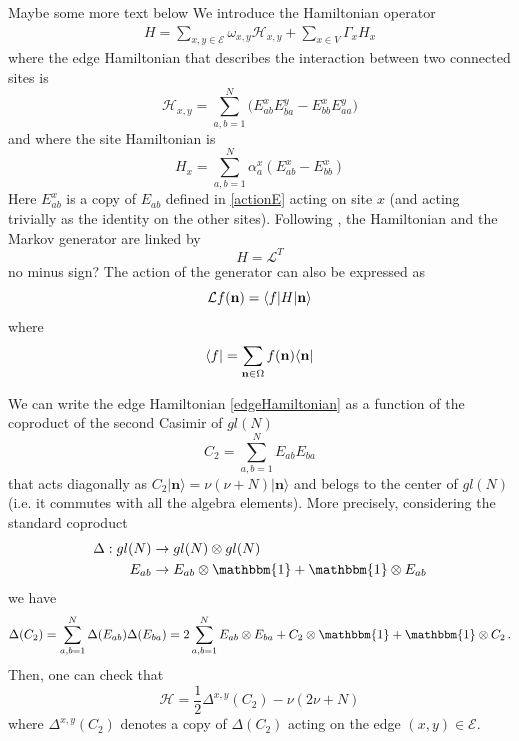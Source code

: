 \documentclass[11pt]{article}
\numberwithin{equation}{section}
\numberwithin{equation}{subsection}
\newcommand{\twoj}{\nu}
\begin{document}
{\color{red}Maybe some more text below}
We introduce the Hamiltonian operator
\begin{equation}\label{OriginalHamiltonian}
	\begin{split}
		H=\sum_{x,y\in \mathcal{E}}\omega_{x,y}\mathcal{H}_{x,y}+\sum_{x\in V}\Gamma_{x}H_{x}
	\end{split}
\end{equation}
where the edge Hamiltonian that describes the interaction between two connected sites is
\begin{equation}\label{edgeHamiltonian}
\mathcal{H}_{x,y}=\sum_{a,b=1}^{N}\Big(E_{ab}^{x} E_{b a}^{y}-E_{bb}^{x} E_{aa}^{y}\Big)
 \end{equation}
  and where the site Hamiltonian is
 \begin{equation}\label{siteHamiltonian}
H_{x}=\sum_{a,b=1}^{N}\alpha_{a}^{x}\left(E_{ab}^{x}-E_{bb}^{x}\right)
\end{equation}
Here $E_{ab}^{x}$ is a copy of $E_{ab}$ defined in \eqref{actionE} acting on site $x$ (and
acting trivially as the identity on the other sites). 
Following  \cite{belitsky2015self}, the Hamiltonian and the Markov generator are linked by
\begin{equation}\label{Hamiltonian-Generator}
H=\mathcal{L}^{T}
\end{equation}
{\color{red} no minus sign?}
The action of the generator can also be expressed as 
\begin{equation}
    \mathcal{L}f( {\bf n})=\langle f|H| {\bf n}\rangle
\end{equation}
where 
\begin{equation}
    \langle f|=\sum_{ {{\bf n}\in \Omega}}f( {\bf n})\langle  {\bf n}|
\end{equation}

We can write the edge Hamiltonian \eqref{edgeHamiltonian} as a function of the coproduct of the second Casimir of $gl(N)$
\begin{equation}\label{secondCasimir}
    C_{2}=\sum_{a,b=1}^{N}E_{ab}E_{ba}
\end{equation}
that acts diagonally as $C_{2}|\bm{n}\rangle=\twoj(\twoj+N)|\bm{n}\rangle$ and belogs to the center of $gl(N)$ (i.e. it commutes with all the algebra elements).  
More precisely,  considering the standard coproduct 
\begin{equation}
\begin{split}
\Delta:gl(N)&\to gl(N)\otimes gl(N)\\
E_{ab}&\to E_{ab}\otimes \mathbbm{1}+\mathbbm{1}\otimes E_{ab}
\end{split}
\end{equation}
we have 
\begin{equation}
\Delta(C_{2})=\sum_{a,b=1}^{N}\Delta(E_{ab})\Delta(E_{ba})=2\sum_{a,b=1}^{N}E_{ab}\otimes E_{ba}+C_{2}\otimes \mathbbm{1}+\mathbbm{1}\otimes C_{2}\,.
\end{equation}
Then, one can check that 
\begin{equation}\label{hamiltonianCasimir}
	\mathcal{H}=\frac{1}{2}\Delta^{x,y}(C_{2})-\twoj(2\twoj+N)
\end{equation}
where $\Delta^{x,y}(C_2)$ denotes a {\color{blue}copy} of $\Delta(C_2)$ acting on  
the edge $(x,y)\in \mathcal{E}$.
\end{document}
